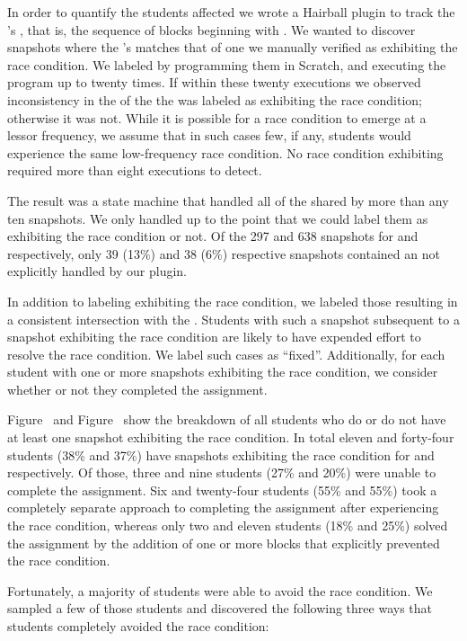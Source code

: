 In order to quantify the students affected we wrote a Hairball plugin to track
the \net{}'s \exe{}, that is, the sequence of blocks beginning with
\netclicked{}. We wanted to discover snapshots where the \net{}'s \exe{}
matches that of one we manually verified as exhibiting the race condition. We
labeled  by programming them in Scratch, and executing the program up to
twenty times. If within these twenty executions we observed inconsistency in
the  of the \zebra{} the \exe{} was labeled as exhibiting the race
condition; otherwise it was not. While it is possible for a race condition to
emerge at a lessor frequency, we assume that in such cases few, if any,
students would experience the same low-frequency race condition. No race
condition exhibiting  required more than eight executions to detect.

The result was a state machine that handled all  of the \net{} shared by
more than any ten snapshots. We only handled  up to the point that we
could label them as exhibiting the race condition or not. Of the 297 and 638
snapshots for \sone{} and \stwo{} respectively, only 39 (13\%) and 38 (6\%)
respective snapshots contained an \exe{} not explicitly handled by our plugin.

In addition to labeling  exhibiting the race condition, we labeled those
resulting in a consistent intersection with the \zebra{}. Students with such a
snapshot subsequent to a snapshot exhibiting the race condition are likely to
have expended effort to resolve the race condition. We label such cases as
``fixed''. Additionally, for each student with one or more snapshots exhibiting
the race condition, we consider whether or not they completed the assignment.

Figure~ and Figure~ show the breakdown
of all students who do or do not have at least one snapshot exhibiting the race
condition. In total eleven and forty-four students (38\% and 37\%) have
snapshots exhibiting the race condition for \sone{} and \stwo{}
respectively. Of those, three and nine students (27\% and 20\%) were unable to
complete the assignment. Six and twenty-four students (55\% and 55\%) took a
completely separate approach to completing the assignment after experiencing
the race condition, whereas only two and eleven students (18\% and 25\%) solved
the assignment by the addition of one or more blocks that explicitly prevented
the race condition.

Fortunately, a majority of students were able to avoid the race condition. We
sampled a few of those students and discovered the following three ways that
students completely avoided the race condition:

